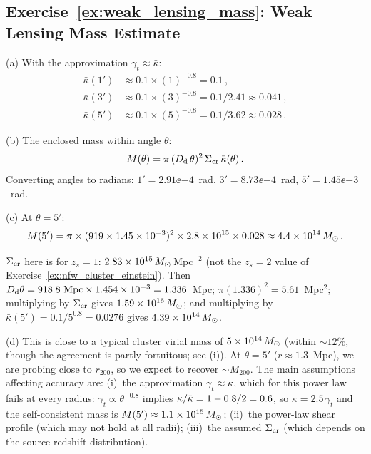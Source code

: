 \subsection*{Exercise~\ref{ex:weak_lensing_mass}: Weak Lensing Mass Estimate}

(a) With the approximation
$\gamma_t \approx \bar{\kappa}$:
\begin{align*}
    \bar{\kappa}(1') &\approx 0.1 \times (1)^{-0.8} = 0.1 \,, \\
    \bar{\kappa}(3') &\approx 0.1 \times (3)^{-0.8}
    = 0.1 / 2.41 \approx 0.041 \,, \\
    \bar{\kappa}(5') &\approx 0.1 \times (5)^{-0.8}
    = 0.1 / 3.62 \approx 0.028 \,.
\end{align*}

(b) The enclosed mass within angle $\theta$:
\begin{equation*}
    M(\theta) = \pi\,(D_{\mathrm{d}}\,\theta)^2\,\Sigma_{\mathrm{cr}}\,\bar{\kappa}(\theta) \,.
\end{equation*}
Converting angles to radians:
$1' = 2.91\ee{-4}$~rad, $3' = 8.73\ee{-4}$~rad,
$5' = 1.45\ee{-3}$~rad.

(c) At $\theta = 5'$:
\begin{equation*}
    M(5') = \pi \times (919 \times 1.45\times 10^{-3})^2
    \times 2.8\times 10^{15} \times 0.028
    \approx 4.4\times 10^{14}\,M_{\odot} \,.
\end{equation*}

\begin{derivation}
$\Sigma_{\mathrm{cr}}$ here is for $z_s = 1$: $2.83\times 10^{15}\,M_{\odot}$\,Mpc$^{-2}$ (not the
$z_s = 2$ value of Exercise~\ref{ex:nfw_cluster_einstein}).  Then
$D_{\mathrm{d}}\theta = 918.8~\text{Mpc}\times1.454\times 10^{-3} = 1.336$~Mpc;
$\pi(1.336)^2 = 5.61$~Mpc$^2$; multiplying by $\Sigma_{\mathrm{cr}}$ gives
$1.59\times 10^{16}\,M_{\odot}$; and multiplying by $\bar\kappa(5') = 0.1/5^{0.8} =
0.0276$ gives $4.39\times 10^{14}\,M_{\odot}$.
\end{derivation}

(d) This is close to a typical cluster virial mass
of $5\times 10^{14}\,M_{\odot}$ (within $\sim 12\%$, though the agreement is partly
fortuitous; see (i)).  At $\theta = 5'$ ($r \approx 1.3$~Mpc),
we are probing close to $r_{200}$, so we expect to recover
$\sim M_{200}$.  The main assumptions affecting accuracy are:
(i)~the approximation $\gamma_t \approx \bar{\kappa}$, which for this
power law fails at every radius: $\gamma_t \propto \theta^{-0.8}$ implies
$\kappa/\bar\kappa = 1 - 0.8/2 = 0.6$, so $\bar\kappa = 2.5\,\gamma_t$ and
the self-consistent mass is $M(5') \approx 1.1\times 10^{15}\,M_{\odot}$;
(ii)~the power-law shear profile (which may not hold at all radii);
(iii)~the assumed $\Sigma_{\mathrm{cr}}$ (which depends on the source redshift
distribution).  \checkmark

